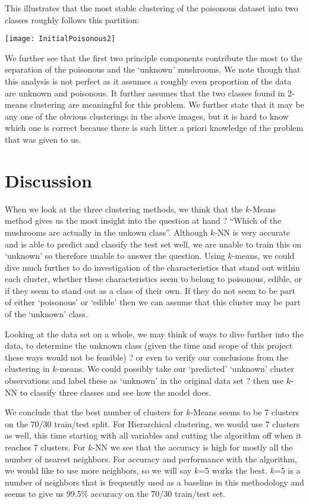 \documentclass{article}
\begin{document}
This illustrates that the most stable clustering of the poisonous dataset into two classes roughly follows this partition:
\begin{center}
\texttt{[image: InitialPoisonous2]}
\end{center}

We further see that the first two principle components contribute the most to the separation of the poisonous and the `unknown' mushrooms. We note though that this analysis is not perfect as it assumes a roughly even proportion of the data are unknown and poisonous. It further assumes that the two classes found in $2$-means clustering are meaningful for this problem. We further state that it may be any one of the obvious clusterings in the above images, but it is hard to know which one is correct because there is such litter a priori knowledge of the problem that was given to us. 


\section{Discussion}

\indent When we look at the three clustering methods, we think that the $k$-Means method gives us the most insight into the question at hand ? ``Which of the mushrooms are actually in the unkown class''. Although $k$-NN is very accurate and is able to predict and classify the test set well, we are unable to train this on `unknown' so therefore unable to answer the question. Using $k$-means, we could dive much further to do investigation of the characteristics that stand out within each cluster, whether these characteristics seem to belong to poisonous, edible, or if they seem to stand out as a class of their own. If they do not seem to be part of either `poisonous' or `edible' then we can assume that this cluster may be part of the `unknown' class. 

Looking at the data set on a whole, we may think of ways to dive further into the data, to determine the unknown class (given the time and scope of this project these ways would not be feasible) ? or even to verify our conclusions from the clustering in $k$-means. We could possibly take our `predicted' `unknown' cluster observations and label these as `unknown' in the original data set ? then use $k$-NN to classify three classes and see how the model does. 

We conclude that the best number of clusters for $k$-Means seems to be 7 clusters on the 70/30 train/test split. For Hierarchical clustering, we would use 7 clusters as well, this time starting with all variables and cutting the algorithm off when it reaches 7 clusters. For $k$-NN we see that the accuracy is high for mostly all the number of nearest neighbors. For accuracy and performance with the algorithm, we would like to use more neighbors, so we will say $k$=5 works the best. $k$=5 is a number of neighbors that is frequently used as a baseline in this methodology and seems to give us 99.5\% accuracy on the 70/30 train/test set.
\end{document}
